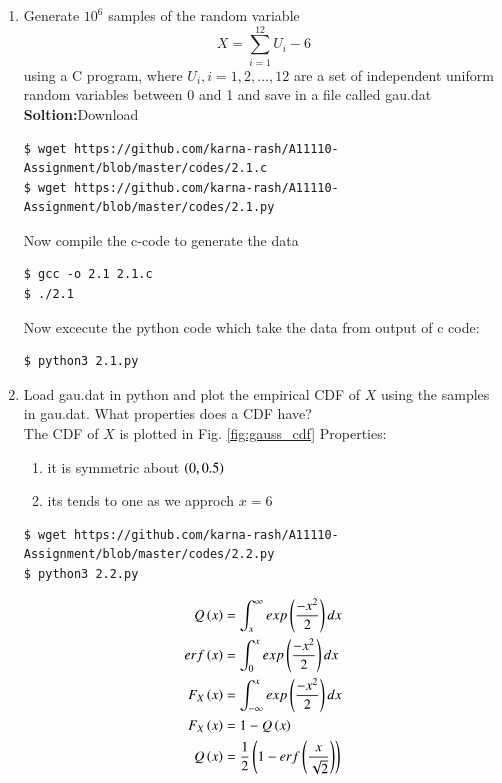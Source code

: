 \documentclass[journal,12pt,twocolumn]{IEEEtran}
\renewcommand\thesection{\arabic{section}}
\begin{document}
\begin{enumerate}[label=\thesection.\arabic*
,ref=\thesection.\theenumi]

%
\item
Generate $10^6$ samples of the random variable
%
\begin{equation}
X = \sum_{i=1}^{12}U_i -6
\end{equation}
%
using a C program, where $U_i, i = 1,2,\dots, 12$ are  a set of independent uniform random variables between 0 and 1
and save in a file called gau.dat\\
\textbf{Soltion:}Download 
\begin{lstlisting}
$ wget https://github.com/karna-rash/A11110-Assignment/blob/master/codes/2.1.c
$ wget https://github.com/karna-rash/A11110-Assignment/blob/master/codes/2.1.py
\end{lstlisting}
Now compile the c-code to generate the data
\begin{lstlisting}
$ gcc -o 2.1 2.1.c
$ ./2.1
\end{lstlisting}
Now excecute the python code which take the data from output of c  code:
\begin{lstlisting}
$ python3 2.1.py
\end{lstlisting}
%
\item
Load gau.dat in python and plot the empirical CDF of $X$ using the samples in gau.dat. What properties does a CDF have?
\\
\solution The CDF of $X$ is plotted in Fig. \ref{fig:gauss_cdf}
Properties:
\begin{enumerate}
\item it is symmetric about $\left(0,0.5\right)$
\item its tends to one as we approch $x=6$
\end{enumerate}
\begin{lstlisting}
$ wget https://github.com/karna-rash/A11110-Assignment/blob/master/codes/2.2.py
$ python3 2.2.py
\end{lstlisting}
\begin{align}
Q\left(x\right)&=\int_{x}^{\infty} exp\left(\frac{-x^2}{2}\right)dx \\
erf\left(x\right)&=\int_{0}^{x}exp\left(\frac{-x^2}{2}\right)dx \\
F_X\left(x\right)&=\int_{-\infty}^{x}exp\left(\frac{-x^2}{2}\right)dx\\
F_X\left(x\right)&=1-Q\left(x\right)\\
Q\left(x\right)&=\frac{1}{2}\left(1-erf\left(\frac{x}{\sqrt{2}}\right)\right)
\end{align}
\begin{figure}

\end{figure}
\end{enumerate}
\end{document}

